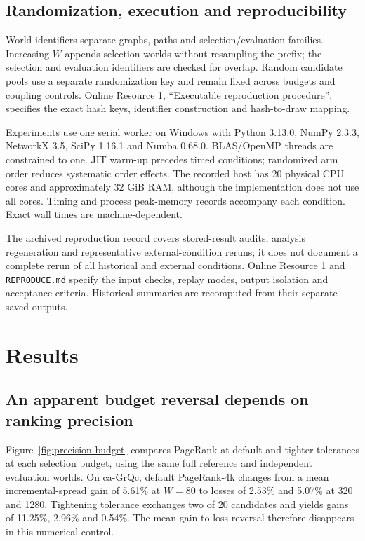 \documentclass[smallextended]{svjour3}
\begin{document}
\subsection{Randomization, execution and reproducibility}
World identifiers separate graphs, paths and selection/evaluation families. Increasing $W$ appends selection worlds without resampling the prefix; the selection and evaluation identifiers are checked for overlap. Random candidate pools use a separate randomization key and remain fixed across budgets and coupling controls. Online Resource 1, ``Executable reproduction procedure'', specifies the exact hash keys, identifier construction and hash-to-draw mapping.

Experiments use one serial worker on Windows with Python 3.13.0, NumPy 2.3.3, NetworkX 3.5, SciPy 1.16.1 and Numba 0.68.0. BLAS/OpenMP threads are constrained to one. JIT warm-up precedes timed conditions; randomized arm order reduces systematic order effects. The recorded host has 20 physical CPU cores and approximately 32 GiB RAM, although the implementation does not use all cores. Timing and process peak-memory records accompany each condition. Exact wall times are machine-dependent.

The archived reproduction record covers stored-result audits, analysis regeneration and representative external-condition reruns; it does not document a complete rerun of all historical and external conditions. Online Resource 1 and \texttt{REPRODUCE.md} specify the input checks, replay modes, output isolation and acceptance criteria. Historical summaries are recomputed from their separate saved outputs.

\section{Results}
\subsection{An apparent budget reversal depends on ranking precision}
Figure~\ref{fig:precision-budget} compares PageRank at default and tighter tolerances at each selection budget, using the same full reference and independent evaluation worlds. On ca-GrQc, default PageRank-4k changes from a mean incremental-spread gain of 5.61\% at $W=80$ to losses of 2.53\% and 5.07\% at 320 and 1280. Tightening tolerance exchanges two of 20 candidates and yields gains of 11.25\%, 2.96\% and 0.54\%. The mean gain-to-loss reversal therefore disappears in this numerical control.
\end{document}
